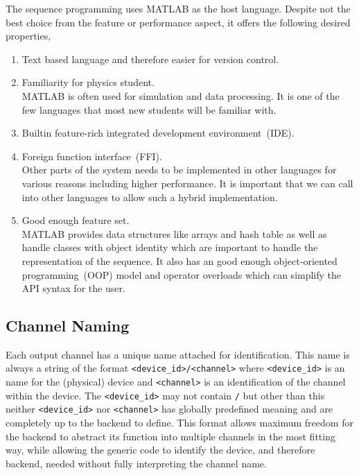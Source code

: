 The sequence programming uses MATLAB as the host language.
Despite not the best choice from the feature or performance aspect,
it offers the following desired properties,
\begin{enumerate}
\item Text based language and therefore easier for version control.
\item Familiarity for physics student.\\
  MATLAB is often used for simulation and data processing.
  It is one of the few languages that most new students will be familiar with.
\item Builtin feature-rich integrated development environment~(IDE).
\item Foreign function interface~(FFI).\\
  Other parts of the system needs to be implemented in other languages
  for various reasons including higher performance.
  It is important that we can call into other languages to allow such a hybrid implementation.
\item Good enough feature set.\\
  MATLAB provides data structures like arrays and hash table
  as well as handle classes with object identity
  which are important to handle the representation of the sequence.
  It also has an good enough object-oriented programming~(OOP) model
  and operator overloads which can simplify the API syntax for the user.
\end{enumerate}

\subsection{Channel Naming}
\label{ch:computer-control:frontend:channel}
Each output channel has a unique name attached for identification.
This name is always a string of the format \verb`<device_id>/<channel>`
where \verb`<device_id>` is an name for the (physical) device
and \verb`<channel>` is an identification of the channel within the device.
The \verb`<device_id>` may not contain \verb`/` but other than this
neither \verb`<device_id>` nor \verb`<channel>` has globally predefined meaning
and are completely up to the backend to define.
This format allows maximum freedom for the backend to abstract its function
into multiple channels in the most fitting way,
while allowing the generic code to identify the device, and therefore backend,
needed without fully interpreting the channel name.

